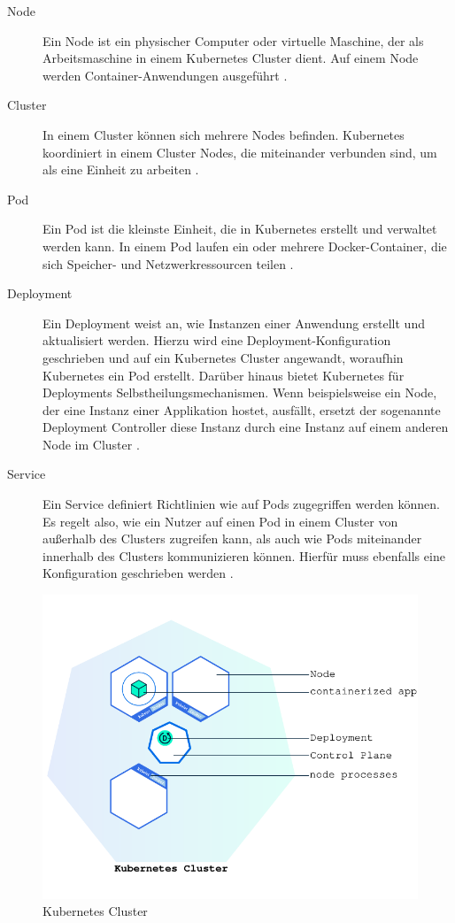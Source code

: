 \begin{description}
  \item[Node] Ein Node ist ein physischer Computer oder virtuelle Maschine, der als Arbeitsmaschine in einem Kubernetes Cluster dient. Auf einem Node werden Container-Anwendungen ausgeführt \citep{kubernetesclusternode:2019}. 
  \item[Cluster] In einem Cluster können sich mehrere Nodes befinden. Kubernetes koordiniert in einem Cluster Nodes, die miteinander verbunden sind, um als eine Einheit zu arbeiten \citep{kubernetesclusternode:2019}.
  \item[Pod] Ein Pod ist die kleinste Einheit, die in Kubernetes erstellt und verwaltet werden kann. In einem Pod laufen ein oder mehrere Docker-Container, die sich Speicher- und Netzwerkressourcen teilen \citep{kubernetespods:2021}.  
  \item[Deployment] Ein Deployment weist an, wie Instanzen einer Anwendung erstellt und aktualisiert werden. Hierzu wird eine Deployment-Konfiguration geschrieben und auf ein Kubernetes Cluster angewandt, woraufhin Kubernetes ein Pod erstellt. Darüber hinaus bietet Kubernetes für Deployments Selbstheilungsmechanismen. Wenn beispielsweise ein Node, der eine Instanz einer Applikation hostet, ausfällt, ersetzt der sogenannte Deployment Controller diese Instanz durch eine Instanz auf einem anderen Node im Cluster \citep{kubernetesdeployment:2021}.
  \item[Service] Ein Service definiert Richtlinien wie auf Pods zugegriffen werden können. Es regelt also, wie ein Nutzer auf einen Pod in einem Cluster von außerhalb des Clusters zugreifen kann, als auch wie Pods miteinander innerhalb des Clusters kommunizieren können. Hierfür muss ebenfalls eine Konfiguration geschrieben werden \citep{kubernetesservice:2021}. 
\end{description}

\begin{figure}[!htb]
  \centering
  \includegraphics[width=1.0\textwidth]{gfx/module_02_first_app.pdf}
  \caption[Kubernetes Cluster]{Kubernetes Cluster \citep{kubernetesdeployment:2021}}
  \label{fig:chapter02:KubernetesCluster}
\end{figure}


